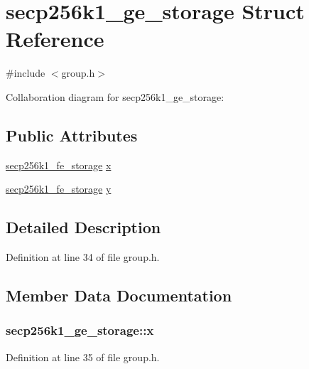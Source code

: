 \hypertarget{structsecp256k1__ge__storage}{}\section{secp256k1\+\_\+ge\+\_\+storage Struct Reference}
\label{structsecp256k1__ge__storage}


{\ttfamily \#include $<$group.\+h$>$}



Collaboration diagram for secp256k1\+\_\+ge\+\_\+storage\+:
\subsection*{Public Attributes}
\begin{DoxyCompactItemize}
\item 
\hyperlink{structsecp256k1__fe__storage}{secp256k1\+\_\+fe\+\_\+storage} \hyperlink{structsecp256k1__ge__storage_abace3c7f244d8e7e42ac1b66a071371b}{x}
\item 
\hyperlink{structsecp256k1__fe__storage}{secp256k1\+\_\+fe\+\_\+storage} \hyperlink{structsecp256k1__ge__storage_af0b13f3e06135a94484cc6f6dd4ef3cc}{y}
\end{DoxyCompactItemize}


\subsection{Detailed Description}


Definition at line 34 of file group.\+h.



\subsection{Member Data Documentation}
\hypertarget{structsecp256k1__ge__storage_abace3c7f244d8e7e42ac1b66a071371b}{}
\subsubsection[{x}]{ secp256k1\+\_\+ge\+\_\+storage\+::x}\label{structsecp256k1__ge__storage_abace3c7f244d8e7e42ac1b66a071371b}


Definition at line 35 of file group.\+h.

